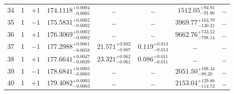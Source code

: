 \begin{table*}[!]
\begin{tabular}{llcrrlrc}
34 & 1 & $+1$ & $    174.1118_{-      0.0005}^{+      0.0004}$ & \multicolumn{1}{c}{\dots} & \multicolumn{1}{c}{\dots} & $     1512.05_{-       91.86}^{+       94.81}$ & \dots \\[1pt]
35 & 1 & $-1$ & $    175.5831_{-      0.0002}^{+      0.0002}$ & \multicolumn{1}{c}{\dots} & \multicolumn{1}{c}{\dots} & $     3969.77_{-      130.21}^{+      163.79}$ & \dots \\[1pt]
36 & 1 & $+1$ & $    176.3069_{-      0.0002}^{+      0.0002}$ & \multicolumn{1}{c}{\dots} & \multicolumn{1}{c}{\dots} & $     9662.76_{-      798.14}^{+      733.52}$ & \dots \\[1pt]
37 & 1 & $-1$ & $    177.2988_{-      0.0058}^{+      0.0061}$ & $      21.571_{-       0.807}^{+       0.802}$ & $       0.119_{-       0.013}^{+       0.013}$ & \multicolumn{1}{c}{\dots} & \dots \\[1pt]
38 & 1 & $+1$ & $    177.6641_{-      0.0039}^{+      0.0047}$ & $      23.321_{-       0.961}^{+       0.962}$ & $       0.086_{-       0.011}^{+       0.011}$ & \multicolumn{1}{c}{\dots} & \dots \\[1pt]
39 & 1 & $-1$ & $    178.6841_{-      0.0003}^{+      0.0003}$ & \multicolumn{1}{c}{\dots} & \multicolumn{1}{c}{\dots} & $     2051.50_{-       98.20}^{+      108.44}$ & \dots \\[1pt]
40 & 1 & $+1$ & $    179.4082_{-      0.0003}^{+      0.0003}$ & \multicolumn{1}{c}{\dots} & \multicolumn{1}{c}{\dots} & $     2153.04_{-      114.72}^{+      129.88}$ & \dots \\[1pt]


\end{tabular}
\end{table*}
